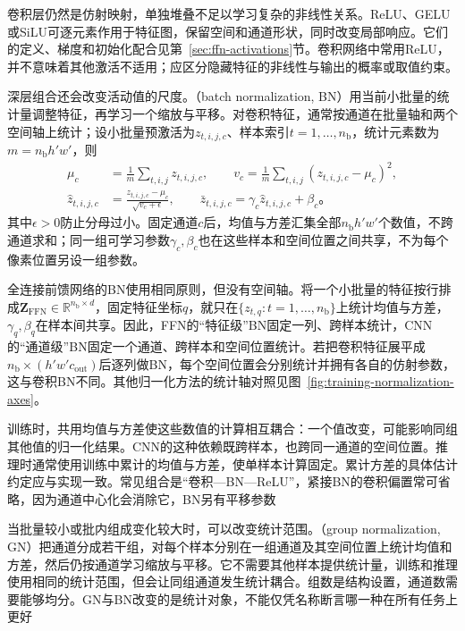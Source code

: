卷积层仍然是仿射映射，单独堆叠不足以学习复杂的非线性关系。ReLU、GELU或SiLU可逐元素作用于特征图，保留空间和通道形状，同时改变局部响应。它们的定义、梯度和初始化配合见第~\ref{sec:ffn-activations}节。卷积网络中常用ReLU，并不意味着其他激活不适用；应区分隐藏特征的非线性与输出的概率或取值约束。

深层组合还会改变活动值的尺度。（batch normalization, BN）用当前小批量的统计量调整特征，再学习一个缩放与平移。对卷积特征，通常按通道在批量轴和两个空间轴上统计；设小批量预激活为$z_{t,i,j,c}$、样本索引$t=1,\ldots,n_{\mathrm b}$，统计元素数为$m=n_{\mathrm b}h'w'$，则
\begin{equation}
  \begin{aligned}
    \mu_c&=\frac1m\sum_{t,i,j}z_{t,i,j,c},\qquad
    v_c=\frac1m\sum_{t,i,j}(z_{t,i,j,c}-\mu_c)^2,\\
    \widehat z_{t,i,j,c}&=\frac{z_{t,i,j,c}-\mu_c}{\sqrt{v_c+\epsilon}},\qquad
    \bar z_{t,i,j,c}=\gamma_c\widehat z_{t,i,j,c}+\beta_c\text{。}
  \end{aligned}
  \label{eq:cnn-batch-normalization}
\end{equation}
其中$\epsilon>0$防止分母过小。固定通道$c$后，均值与方差汇集全部$n_{\mathrm b}h'w'$个数值，不跨通道求和；同一组可学习参数$\gamma_c,\beta_c$也在这些样本和空间位置之间共享，不为每个像素位置另设一组参数。

全连接前馈网络的BN使用相同原则，但没有空间轴。将一个小批量的特征按行排成$\bm Z_{\mathrm{FFN}}\in\mathbb R^{n_{\mathrm b}\times d}$，固定特征坐标$q$，就只在$\{z_{t,q}:t=1,\ldots,n_{\mathrm b}\}$上统计均值与方差，$\gamma_q,\beta_q$在样本间共享。因此，FFN的“特征级”BN固定一列、跨样本统计，CNN的“通道级”BN固定一个通道、跨样本和空间位置统计。若把卷积特征展平成$n_{\mathrm b}\times(h'w'c_{\mathrm{out}})$后逐列做BN，每个空间位置会分别统计并拥有各自的仿射参数，这与卷积BN不同。其他归一化方法的统计轴对照见图~\ref{fig:training-normalization-axes}。

训练时，共用均值与方差使这些数值的计算相互耦合：一个值改变，可能影响同组其他值的归一化结果。CNN的这种依赖既跨样本，也跨同一通道的空间位置。推理时通常使用训练中累计的均值与方差，使单样本计算固定。累计方差的具体估计约定应与实现一致。常见组合是“卷积—BN—ReLU”，紧接BN的卷积偏置常可省略，因为通道中心化会消除它，BN另有平移参数

当批量较小或批内组成变化较大时，可以改变统计范围。（group normalization, GN）把通道分成若干组，对每个样本分别在一组通道及其空间位置上统计均值和方差，然后仍按通道学习缩放与平移。它不需要其他样本提供统计量，训练和推理使用相同的统计范围，但会让同组通道发生统计耦合。组数是结构设置，通道数需要能够均分。GN与BN改变的是统计对象，不能仅凭名称断言哪一种在所有任务上更好

